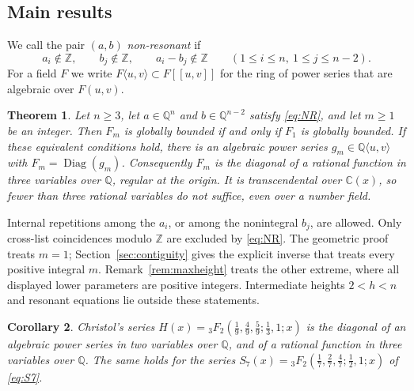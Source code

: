 \documentclass[11pt]{amsart}
\newtheorem{mainthm}{Theorem}
\newtheorem{maincor}[mainthm]{Corollary}
\theoremstyle{definition}
\theoremstyle{remark}
\numberwithin{equation}{section}
\newcommand{\Q}{\mathbb{Q}}
\newcommand{\Z}{\mathbb{Z}}
\newcommand{\C}{\mathbb{C}}
\newcommand{\alg}[2]{#1\langle #2\rangle}
\DeclareMathOperator{\Diag}{Diag}
\begin{document}
\subsection{Main results}
We call the pair $(a,b)$ \emph{non-resonant} if
\begin{equation}\tag{NR}\label{eq:NR}
a_i\notin\Z,\qquad b_j\notin\Z,\qquad a_i-b_j\notin\Z\qquad(1\le i\le n,\ 1\le j\le n-2).
\end{equation}
For a field $F$ we write $\alg F{u,v}\subset F[[u,v]]$ for the ring of power series that are algebraic over $F(u,v)$.

\begin{mainthm}\label{thm:A}
Let $n\ge3$, let $a\in\Q^n$ and $b\in\Q^{n-2}$ satisfy \eqref{eq:NR}, and let $m\ge1$ be an integer. Then $F_m$ is globally bounded if and only if $F_1$ is globally bounded. If these equivalent conditions hold, there is an algebraic power series $g_m\in\alg\Q{u,v}$ with $F_m=\Diag(g_m)$. Consequently $F_m$ is the diagonal of a rational function in three variables over $\Q$, regular at the origin. It is transcendental over $\C(x)$, so fewer than three rational variables do not suffice, even over a number field.
\end{mainthm}

Internal repetitions among the $a_i$, or among the nonintegral $b_j$, are allowed. Only cross-list coincidences modulo $\Z$ are excluded by \eqref{eq:NR}. The geometric proof treats $m=1$; Section~\ref{sec:contiguity} gives the explicit inverse that treats every positive integral $m$. Remark~\ref{rem:maxheight} treats the other extreme, where all displayed lower parameters are positive integers. Intermediate heights $2<h<n$ and resonant equations lie outside these statements.


\begin{maincor}\label{cor:B}
Christol's series $H(x)={}_3F_2(\frac19,\frac49,\frac59;\frac13,1;x)$ is the diagonal of an algebraic power series in two variables over $\Q$, and of a rational function in three variables over $\Q$. The same holds for the series $S_7(x)={}_3F_2(\frac17,\frac27,\frac47;\frac12,1;x)$ of \eqref{eq:S7}.
\end{maincor}
\end{document}
